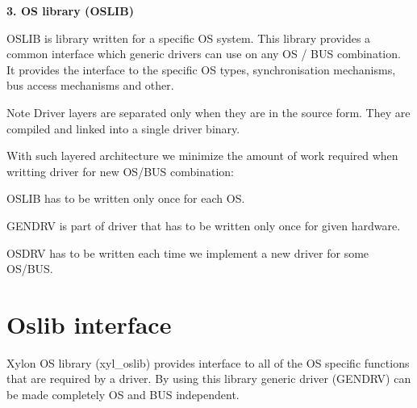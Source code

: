 {\bfseries  3. \-O\-S library (\-O\-S\-L\-I\-B) }\par
 \-O\-S\-L\-I\-B is library written for a specific \-O\-S system. \-This library provides a common interface which generic drivers can use on any \-O\-S / \-B\-U\-S combination. \-It provides the interface to the specific \-O\-S types, synchronisation mechanisms, bus access mechanisms and other. \par
 \begin{DoxyNote}{\-Note}
\-Driver layers are separated only when they are in the source form. \-They are compiled and linked into a single driver binary. \par
 \par
 \-With such layered architecture we minimize the amount of work required when writting driver for new \-O\-S/\-B\-U\-S combination\-:
\begin{DoxyItemize}
\item \-O\-S\-L\-I\-B has to be written only once for each \-O\-S.
\item \-G\-E\-N\-D\-R\-V is part of driver that has to be written only once for given hardware.
\item \-O\-S\-D\-R\-V has to be written each time we implement a new driver for some \-O\-S/\-B\-U\-S.
\end{DoxyItemize}
\end{DoxyNote}
\hypertarget{p3_p3s3}{}\section{\-Oslib interface}\label{p3_p3s3}
\-Xylon \-O\-S library (xyl\-\_\-oslib) provides interface to all of the \-O\-S specific functions that are required by a driver. \-By using this library generic driver (\-G\-E\-N\-D\-R\-V) can be made completely \-O\-S and \-B\-U\-S independent.

